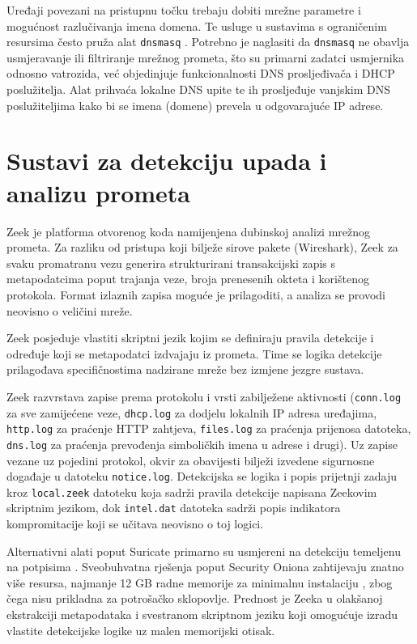 Uređaji povezani na pristupnu točku trebaju dobiti mrežne parametre i mogućnost razlučivanja imena domena. Te usluge u sustavima s ograničenim resursima često pruža alat \texttt{dnsmasq} \cite{dnsmasq_docs}. 
Potrebno je naglasiti da \texttt{dnsmasq} ne obavlja usmjeravanje ili filtriranje mrežnog prometa, što su primarni zadatci usmjernika odnosno vatrozida, 
već objedinjuje funkcionalnosti DNS prosljeđivača  i DHCP poslužitelja. Alat prihvaća lokalne DNS upite te ih prosljeđuje vanjskim DNS poslužiteljima kako bi se imena 
(domene) prevela u odgovarajuće IP adrese. 

\section{Sustavi za detekciju upada i analizu prometa}

Zeek je platforma otvorenog koda \cite{zeek_docs} namijenjena dubinskoj analizi mrežnog prometa. Za razliku od pristupa koji bilježe sirove pakete (Wireshark), Zeek za svaku promatranu vezu generira strukturirani transakcijski
zapis  s metapodatcima poput trajanja veze, broja prenesenih okteta i korištenog protokola. Format izlaznih zapisa moguće je prilagoditi, a analiza se
provodi neovisno o veličini mreže.

Zeek posjeduje vlastiti skriptni jezik kojim se definiraju pravila detekcije i određuje koji se metapodatci izdvajaju iz prometa. Time se logika detekcije prilagođava
specifičnostima nadzirane mreže bez izmjene jezgre sustava.

Zeek razvrstava zapise prema protokolu i vrsti zabilježene aktivnosti (\texttt{conn.log} za sve zamijećene veze, \texttt{dhcp.log} za dodjelu lokalnih IP adresa uređajima, \texttt{http.log} za praćenje HTTP zahtjeva, \texttt{files.log} za praćenja prijenosa datoteka, \texttt{dns.log} za praćenja prevođenja simboličkih imena u adrese i drugi).
Uz zapise vezane uz pojedini protokol, okvir za obavijesti  bilježi izvedene sigurnosne događaje u datoteku \texttt{notice.log}.
Detekcijska se logika i popis prijetnji zadaju kroz \texttt{local.zeek} datoteku koja sadrži pravila detekcije napisana Zeekovim skriptnim jezikom, dok \texttt{intel.dat} datoteka sadrži popis indikatora kompromitacije koji se učitava neovisno o toj logici.

Alternativni alati poput Suricate \cite{suricata_docs} primarno su usmjereni na detekciju temeljenu na potpisima . Sveobuhvatna rješenja poput Security Oniona zahtijevaju znatno više resursa, najmanje 12 GB radne memorije za minimalnu instalaciju \cite{security_onion, security_onion_hwreq}, zbog čega nisu prikladna za 
potrošačko sklopovlje. Prednost je Zeeka u olakšanoj ekstrakciji metapodataka i svestranom skriptnom jeziku koji omogućuje izradu vlastite detekcijske logike uz malen memorijski otisak.

